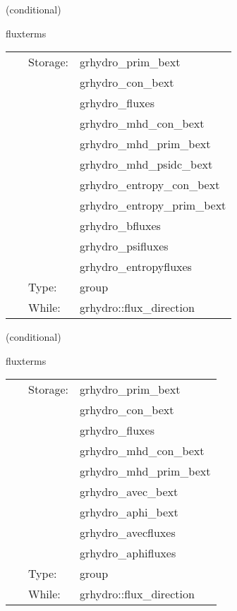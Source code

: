 \documentclass{article}
\begin{document}
\vspace{5mm}

   (conditional) 

\hspace{5mm} fluxterms 

\hspace{5mm}{\it calculation of intercell fluxes } 


\hspace{5mm}

 \begin{tabular*}{160mm}{cll} 
~ & Storage:  & grhydro\_prim\_bext \\ 
~& ~ &grhydro\_con\_bext\\ 
~& ~ &grhydro\_fluxes\\ 
~& ~ &grhydro\_mhd\_con\_bext\\ 
~& ~ &grhydro\_mhd\_prim\_bext\\ 
~& ~ &grhydro\_mhd\_psidc\_bext\\ 
~& ~ &grhydro\_entropy\_con\_bext\\ 
~& ~ &grhydro\_entropy\_prim\_bext\\ 
~& ~ &grhydro\_bfluxes\\ 
~& ~ &grhydro\_psifluxes\\ 
~& ~ &grhydro\_entropyfluxes\\ 
~ & Type:  & group \\ 
~ & While:  & grhydro::flux\_direction \\ 
\end{tabular*} 


\vspace{5mm}

   (conditional) 

\hspace{5mm} fluxterms 

\hspace{5mm}{\it calculation of intercell fluxes } 


\hspace{5mm}

 \begin{tabular*}{160mm}{cll} 
~ & Storage:  & grhydro\_prim\_bext \\ 
~& ~ &grhydro\_con\_bext\\ 
~& ~ &grhydro\_fluxes\\ 
~& ~ &grhydro\_mhd\_con\_bext\\ 
~& ~ &grhydro\_mhd\_prim\_bext\\ 
~& ~ &grhydro\_avec\_bext\\ 
~& ~ &grhydro\_aphi\_bext\\ 
~& ~ &grhydro\_avecfluxes\\ 
~& ~ &grhydro\_aphifluxes\\ 
~ & Type:  & group \\ 
~ & While:  & grhydro::flux\_direction \\ 
\end{tabular*} 
\end{document}
